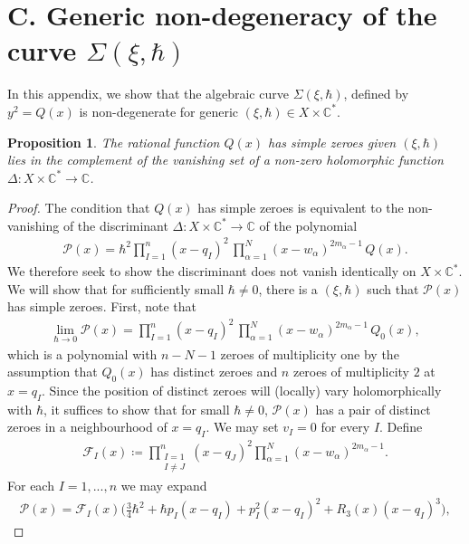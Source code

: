 \documentclass[a4paper,12pt,reqno]{amsart}
\newcounter{counter2}
\numberwithin{equation}{section}
\numberwithin{counter2}{section}
\newcounter{counter3}
\newtheorem{prop}[counter2]{Proposition}
\begin{document}
 \section{C.  Generic non-degeneracy of the curve $\Sigma(\xi,\hbar)$}\label{generic_non_singularity}
 In this appendix,  we show that the algebraic curve $\Sigma(\xi,\hbar)$,  defined by $y^2 = Q(x)$ is non-degenerate for generic $(\xi,\hbar) \in X \times \mathbb{C}^*$.  
 \begin{prop}
The rational function $Q(x)$ has simple zeroes given $(\xi,\hbar)$ lies in the complement of the vanishing set of a non-zero holomorphic function $\Delta: X \times \mathbb{C}^* \to \mathbb{C}$.  
\end{prop}
\begin{proof} 
The condition that $Q(x)$ has simple zeroes is equivalent to the non-vanishing of the discriminant $\Delta: X \times \mathbb{C}^* \to \mathbb{C}$ of the polynomial 
\begin{align}
\mathcal{P}(x) = \hbar^2\prod_{I=1}^{n}(x-q_I)^2\,  \prod_{\alpha=1}^{N}(x-w_\alpha)^{2m_\alpha -1} \, Q(x).
\end{align}
We therefore seek to show the discriminant does not vanish identically on $X \times \mathbb{C}^*$.  
We will show that for sufficiently small $\hbar \ne 0$,  there is a $(\xi,\hbar)$ such that $\mathcal{P}(x)$ has simple zeroes.  First,  note that
\begin{align}
\lim_{\hbar \to 0} \mathcal{P}(x) = \prod_{I=1}^{n}(x-q_I)^2 \,  \prod_{\alpha=1}^{N}(x-w_\alpha)^{2m_\alpha -1} \,  Q_0(x),  
\end{align}
which is a polynomial with $n - N - 1$ zeroes of multiplicity one by the assumption that $Q_0(x)$ has distinct zeroes and $n$ zeroes of multiplicity $2$ at $x = q_I$.  Since the position of distinct zeroes will (locally) vary holomorphically with $\hbar$,  it suffices to show that for small $\hbar \ne 0$,  $\mathcal{P}(x)$ has a pair of distinct zeroes in a neighbourhood of $x = q_I$.  We may set $v_I = 0$ for every $I$.  Define 
\begin{align}
\mathcal{F}_I(x) \coloneqq \prod_{\substack{I = 1 \\ I \ne J}}^n (x - q_J)^2 \prod_{\alpha=1}^N (x-w_\alpha) ^{2m_\alpha -1}.  
\end{align}
For each $I = 1,...,n$ we may expand
\begin{align}
\mathcal{P}(x) = \mathcal{F}_I(x)\Bigg( \frac{3}{4}\hbar^2 + \hbar p_I(x-q_I) + p_I^2(x-q_I)^2 + R_3(x) (x-q_I)^3\Bigg),  
\end{align}

\end{proof}
\end{document}

